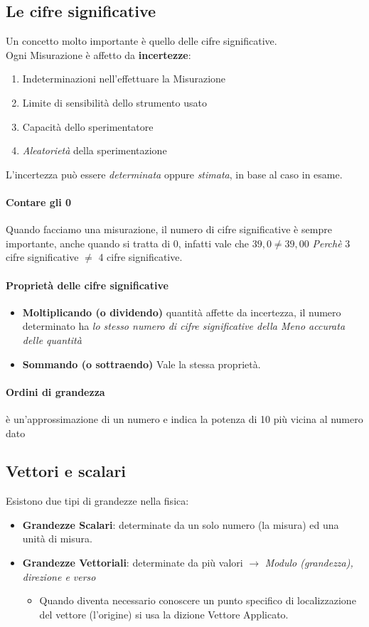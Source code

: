 \documentclass[12pt, a4paper, openany]{book}
\begin{document}
\subsection*{Le cifre significative}
Un concetto molto importante è quello delle cifre significative.
\\Ogni Misurazione è affetto da \textbf{incertezze}:
\begin{enumerate}
    \item Indeterminazioni nell'effettuare la Misurazione
    \item Limite di sensibilità dello strumento usato
    \item Capacità dello sperimentatore
    \item \emph{Aleatorietà} della sperimentazione
\end{enumerate}
L'incertezza può essere \emph{determinata} oppure \emph{stimata}, in base al caso in esame.
\paragraph*{Contare gli 0} Quando facciamo una misurazione, il numero di cifre significative è sempre importante, anche quando si tratta di 0,
infatti vale che $39,0 \neq 39,00$ \emph{Perchè} 3 cifre significative $\neq$ 4 cifre significative.
\paragraph*{Proprietà delle cifre significative}
\begin{itemize}
    \item \textbf{Moltiplicando (o dividendo)} quantità affette da incertezza, il numero determinato ha \emph{lo stesso numero di cifre significative della Meno accurata delle quantità}
    \item \textbf{Sommando (o sottraendo)} Vale la stessa proprietà.
\end{itemize}



\paragraph*{Ordini di grandezza} 
è un'approssimazione di un numero e indica la potenza di 10 più vicina al numero dato

\subsection*{Vettori e scalari} Esistono due tipi di grandezze nella fisica:
\begin{itemize}
    \item \textbf{Grandezze Scalari}: determinate da un solo numero (la misura) ed una unità di misura.
    \item \textbf{Grandezze Vettoriali}: determinate da più valori $\to$ \emph{Modulo (grandezza), direzione e verso}
    \begin{itemize}
        \item Quando diventa necessario conoscere un punto specifico di localizzazione del vettore (l'origine) si usa la dizione Vettore Applicato.
    \end{itemize}
\end{itemize}
\end{document}
